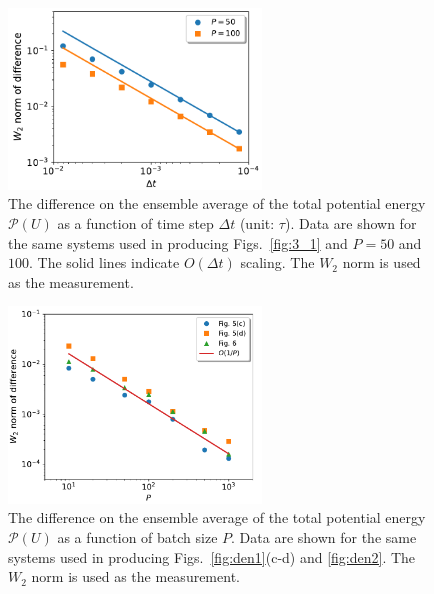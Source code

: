 \begin{figure}[htbp]
\begin{center}
\includegraphics[width=0.6\textwidth]{figs/Energy_3_1.pdf}
\caption{ {The difference on the ensemble average of the total potential energy $\mathscr{P}(U)$ as a function of time step $\Delta t$ (unit: $\tau$). Data are shown for the same systems used in producing Figs.~\ref{fig:3_1} and $P=50$ and $100$. The solid lines indicate $O(\Delta t)$ scaling. The $W_2$ norm is used as the measurement.}}
\label{fig:energy2d_3_1}
\end{center} 
\end{figure}

\begin{figure}[htbp]
\begin{center}
\includegraphics[width=0.6\textwidth]{figs/Energy.pdf}
\caption{The difference on the ensemble average of the total potential energy $\mathscr{P}(U)$ as a function of batch size $P$. Data are shown for the same systems used in producing Figs.~\ref{fig:den1}(c-d) and \ref{fig:den2}. The $W_2$ norm is used as the measurement.}
\label{fig:energy2d}
\end{center} 
\end{figure}

